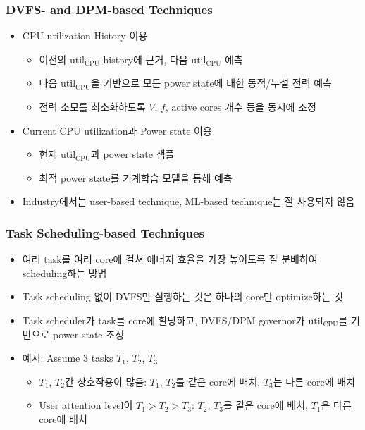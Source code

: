 \subsubsection*{DVFS- and DPM-based Techniques}
\begin{itemize}
    \item CPU utilization History 이용
    \begin{itemize}
        \item 이전의 $\mathrm{util_{CPU}}$ history에 근거, 다음 $\mathrm{util_{CPU}}$ 예측
        \item 다음 $\mathrm{util_{CPU}}$을 기반으로 모든 power state에 대한 동적/누설 전력 예측
        \item 전력 소모를 최소화하도록 $V$, $f$, active cores 개수 등을 동시에 조정
    \end{itemize}
    \item Current CPU utilization과 Power state 이용
    \begin{itemize}
        \item 현재 $\mathrm{util_{CPU}}$과 power state 샘플
        \item 최적 power state를 기계학습 모델을 통해 예측
    \end{itemize}
    \item Industry에서는 user-based technique, ML-based technique는 잘 사용되지 않음
\end{itemize}

\subsubsection*{Task Scheduling-based Techniques}
\begin{itemize}
    \item 여러 task를 여러 core에 걸쳐 에너지 효율을 가장 높이도록 잘 분배하여 scheduling하는 방법
    \item Task scheduling 없이 DVFS만 실행하는 것은 하나의 core만 optimize하는 것
    \item Task scheduler가 task를 core에 할당하고, DVFS/DPM governor가 $\mathrm{util_{CPU}}$를 기반으로 power state 조정
    \item 예시: Assume 3 tasks $T_1$, $T_2$, $T_3$
    \begin{itemize}
        \item $T_1$, $T_2$간 상호작용이 많음: $T_1$, $T_2$를 같은 core에 배치, $T_3$는 다른 core에 배치
        \item User attention level이 $T_1>T_2>T_3$: $T_2$, $T_3$를 같은 core에 배치, $T_1$은 다른 core에 배치
    \end{itemize}
\end{itemize}

